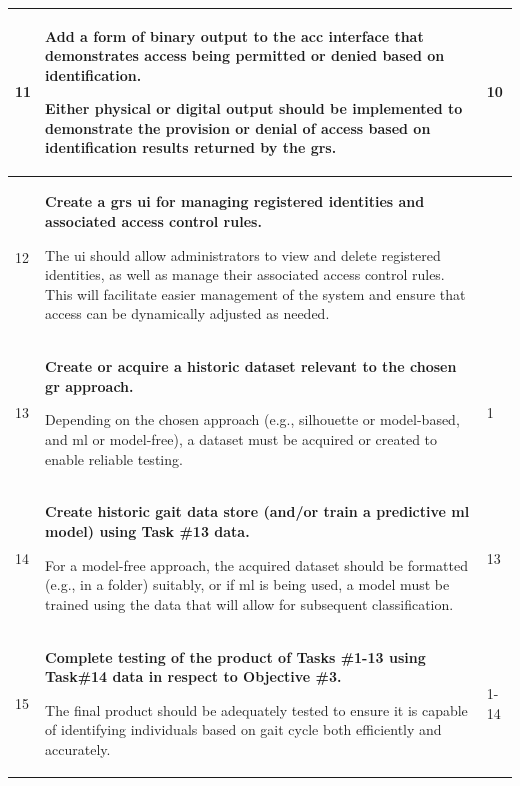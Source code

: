 \begin{scriptsize}
\begin{longtable}[c]{|p{}|p{}|p{}|}
        11          & \textbf{Add a form of binary output to the \ac{acc} interface that demonstrates access being permitted or denied based on identification.}                              \par Either physical or digital output should be implemented to demonstrate the provision or denial of access based on identification results returned by the \ac{grs}.                                                                          & 10                    \\ \hline
        12          & \textbf{Create a \ac{grs} \ac{ui} for managing registered identities and associated access control rules.} \par The \ac{ui} should allow administrators to view and delete registered identities, as well as manage their associated access control rules. This will facilitate easier management of the system and ensure that access can be dynamically adjusted as needed.                                            &                       \\ \hline
        13          & \textbf{Create or acquire a historic dataset relevant to the chosen \ac{gr} approach.}                                               \par Depending on the chosen approach (e.g., silhouette or model-based, and \ac{ml} or model-free), a dataset must be acquired or created to enable reliable testing.                                                                                                               & 1                     \\
        14          & \textbf{Create historic gait data store (and/or train a predictive \ac{ml} model) using Task \#13 data.}                           \par For a model-free approach, the acquired dataset should be formatted (e.g., in a folder) suitably, or if \ac{ml} is being used, a model must be trained using the data that will allow for subsequent classification.                                                             & 13                    \\ \hline
        15          & \textbf{Complete testing of the product of Tasks \#1-13 using Task\#14 data in respect to Objective \#3.}                                                         \par The final product should be adequately tested to ensure it is capable of identifying individuals based on gait cycle both efficiently and accurately.                                                                                             & 1-14                  \\ \hline

\end{longtable}
\end{scriptsize}
